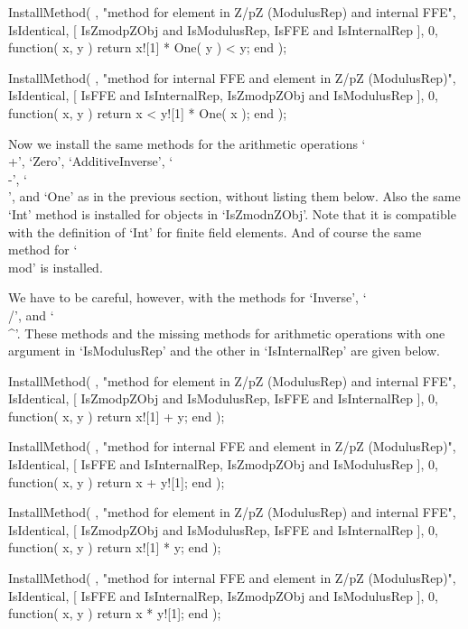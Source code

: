     InstallMethod( \<,
        "method for element in Z/pZ (ModulusRep) and internal FFE",
        IsIdentical,
        [ IsZmodpZObj and IsModulusRep, IsFFE and IsInternalRep ], 0,
        function( x, y )
        return x![1] * One( y ) < y;
        end );

    InstallMethod( \<,
        "method for internal FFE and element in Z/pZ (ModulusRep)",
        IsIdentical,
        [ IsFFE and IsInternalRep, IsZmodpZObj and IsModulusRep ], 0,
        function( x, y )
        return x < y![1] * One( x );
        end );
\endexample

Now we install the same methods for the arithmetic operations
`\\+', `Zero', `AdditiveInverse', `\\-', `\\\*', and `One'
as in the previous section, without listing them below.
Also the same `Int' method is installed for objects in `IsZmodnZObj'.
Note that it is compatible with the definition of `Int' for finite
field elements.
And of course the same method for `\\mod' is installed.

We have to be careful, however, with the methods for `Inverse', `\\/',
and `\\^'.
These methods and the missing methods for arithmetic operations with
one argument in `IsModulusRep' and the other in `IsInternalRep'
are given below.

\beginexample
    InstallMethod( \+,
        "method for element in Z/pZ (ModulusRep) and internal FFE",
        IsIdentical,
        [ IsZmodpZObj and IsModulusRep, IsFFE and IsInternalRep ], 0,
        function( x, y ) return x![1] + y; end );

    InstallMethod( \+,
        "method for internal FFE and element in Z/pZ (ModulusRep)",
        IsIdentical,
        [ IsFFE and IsInternalRep, IsZmodpZObj and IsModulusRep ], 0,
        function( x, y ) return x + y![1]; end );

    InstallMethod( \*,
        "method for element in Z/pZ (ModulusRep) and internal FFE",
        IsIdentical,
        [ IsZmodpZObj and IsModulusRep, IsFFE and IsInternalRep ], 0,
        function( x, y ) return x![1] * y; end );

    InstallMethod( \*,
        "method for internal FFE and element in Z/pZ (ModulusRep)",
        IsIdentical,
        [ IsFFE and IsInternalRep, IsZmodpZObj and IsModulusRep ], 0,
        function( x, y ) return x * y![1]; end );

